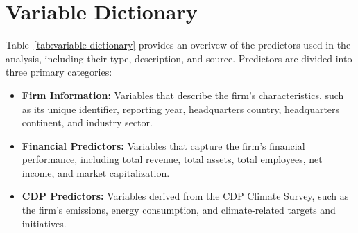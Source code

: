 \section{Variable Dictionary}
\label{sec:variable-dictionary}

\noindent Table~\ref{tab:variable-dictionary} provides an overivew of the predictors used in the analysis, including their type, description, and source. Predictors are divided into three primary categories: \begin{itemize}
    \item \textbf{Firm Information:} Variables that describe the firm's characteristics, such as its unique identifier, reporting year, headquarters country, headquarters continent, and industry sector.
    \item \textbf{Financial Predictors:} Variables that capture the firm's financial performance, including total revenue, total assets, total employees, net income, and market capitalization.
    \item \textbf{CDP Predictors:} Variables derived from the CDP Climate Survey, such as the firm's emissions, energy consumption, and climate-related targets and initiatives.
\end{itemize}



